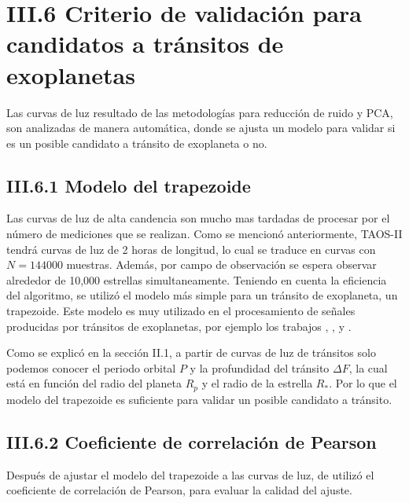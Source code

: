 \section*{III.6 Criterio de validación para candidatos a tránsitos de exoplanetas}

Las curvas de luz resultado de las metodologías para reducción de ruido y PCA, son analizadas de manera automática, donde se ajusta un modelo para validar si es un posible candidato a tránsito de exoplaneta o no.

\subsection*{III.6.1 Modelo del trapezoide}

Las curvas de luz de alta candencia son mucho mas tardadas de procesar por el número de mediciones que se realizan. Como se mencionó anteriormente, TAOS-II tendrá curvas de luz de 2 horas de longitud, lo cual se traduce en curvas con $N=144000$ muestras. Además, por campo de observación se espera observar alrededor de 10,000 estrellas simultaneamente. Teniendo en cuenta la eficiencia del algoritmo, se utilizó el modelo más simple para un tránsito de exoplaneta, un trapezoide. Este modelo es muy utilizado en el procesamiento de señales producidas por tránsitos de exoplanetas, por ejemplo los trabajos \cite{alapini2010transiting}, \cite{hippke2019optimized}, \cite{kipping2016observational} y \cite{morton2012efficient}.


Como se explicó en la sección II.1, a partir de curvas de luz de tránsitos solo podemos conocer el periodo orbital $P$ y la profundidad del tránsito $\Delta F$, la cual está en función del radio del planeta $R_{p}$ y el radio de la estrella $R_{*}$. Por lo que el modelo del trapezoide es suficiente para validar un posible candidato a tránsito.

\subsection*{III.6.2 Coeficiente de correlación de Pearson}

Después de ajustar el modelo del trapezoide a las curvas de luz, de utilizó el coeficiente de correlación de Pearson, para evaluar la calidad del ajuste. 

